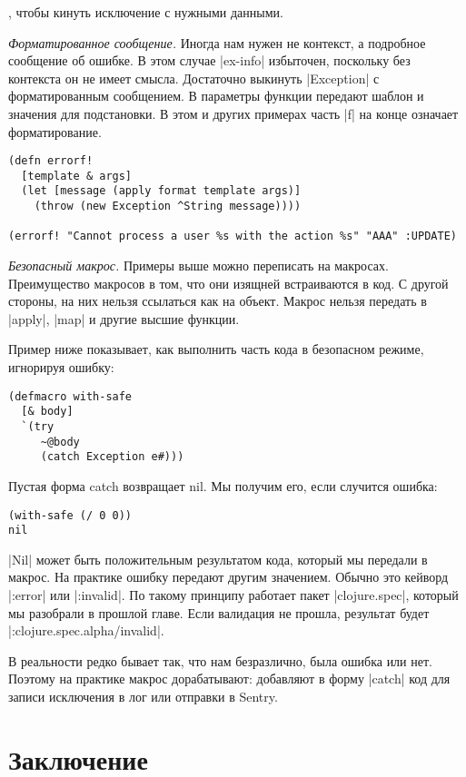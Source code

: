 , чтобы кинуть исключение с нужными данными.

\emph{Форматированное сообщение.} Иногда нам нужен не контекст, а подробное
сообщение об ошибке. В этом случае \spverb|ex-info| избыточен, поскольку без контекста
он не имеет смысла. Достаточно выкинуть \spverb|Exception| с форматированным
сообщением. В параметры функции передают шаблон и значения для подстановки. В
этом и других примерах часть \spverb|f| на конце означает форматирование.

\begin{verbatim}
(defn errorf!
  [template & args]
  (let [message (apply format template args)]
    (throw (new Exception ^String message))))

(errorf! "Cannot process a user %s with the action %s" "AAA" :UPDATE)
\end{verbatim}

\emph{Безопасный макрос.} Примеры выше можно переписать на макросах. Преимущество
макросов в том, что они изящней встраиваются в код. С другой стороны, на них
нельзя ссылаться как на объект. Макрос нельзя передать в \spverb|apply|, \spverb|map| и другие
высшие функции.

Пример ниже показывает, как выполнить часть кода в безопасном режиме, игнорируя
ошибку:

\begin{verbatim}
(defmacro with-safe
  [& body]
  `(try
     ~@body
     (catch Exception e#)))
\end{verbatim}

Пустая форма catch возвращает nil. Мы получим его, если случится ошибка:

\begin{verbatim}
(with-safe (/ 0 0))
nil
\end{verbatim}

\spverb|Nil| может быть положительным результатом кода, который мы передали в
макрос. На практике ошибку передают другим значением. Обычно это кейворд
\spverb|:error| или \spverb|:invalid|. По такому принципу работает пакет \spverb|clojure.spec|,
который мы разобрали в прошлой главе. Если валидация не прошла, результат будет
\spverb|:clojure.spec.alpha/invalid|.

В реальности редко бывает так, что нам безразлично, была ошибка или нет. Поэтому
на практике макрос дорабатывают: добавляют в форму \spverb|catch| код для записи
исключения в лог или отправки в Sentry.

\section{Заключение}

